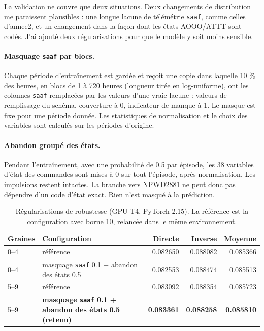\documentclass[11pt,a4paper]{article}
\newcommand{\code}[1]{\texttt{#1}}
\begin{document}
La validation ne couvre que deux situations. Deux changements de distribution me paraissent plausibles : une longue lacune de télémétrie \code{saaf}, comme celles d'annee2, et un changement dans la façon dont les états AOOO/ATTT sont codés. J'ai ajouté deux régularisations pour que le modèle y soit moins sensible.

\paragraph{Masquage \code{saaf} par blocs.} Chaque période d'entraînement est gardée et reçoit une copie dans laquelle 10 \% des heures, en blocs de 1 à 720 heures (longueur tirée en log-uniforme), ont les colonnes \code{saaf} remplacées par les valeurs d'une vraie lacune : valeurs de remplissage du schéma, couverture à 0, indicateur de manque à 1. Le masque est fixe pour une période donnée. Les statistiques de normalisation et le choix des variables sont calculés sur les périodes d'origine.

\paragraph{Abandon groupé des états.} Pendant l'entraînement, avec une probabilité de 0.5 par épisode, les 38 variables d'état des commandes sont mises à 0 sur tout l'épisode, après normalisation. Les impulsions restent intactes. La branche vers NPWD2881 ne peut donc pas dépendre d'un code d'état exact. Rien n'est masqué à la prédiction.

\begin{table}[!htb]
\centering\small
\caption{Régularisations de robustesse (GPU T4, PyTorch 2.15). La référence est la configuration avec borne 10, relancée dans le même environnement.}
\label{tab:regularisations}
\begin{tabularx}{\linewidth}{l X r r r}
\toprule
Graines & Configuration & Directe & Inverse & Moyenne \\
\midrule
0--4 & référence & 0.082650 & 0.088082 & 0.085366 \\
0--4 & masquage \code{saaf} 0.1 + abandon des états 0.5 & 0.082553 & 0.088474 & 0.085513 \\
5--9 & référence & 0.083092 & 0.088354 & 0.085723 \\
\rowcolor{fond} 5--9 & \textbf{masquage \code{saaf} 0.1 + abandon des états 0.5 (retenu)} & \textbf{0.083361} & \textbf{0.088258} & \textbf{0.085810} \\
\bottomrule
\end{tabularx}
\end{table}
\end{document}
